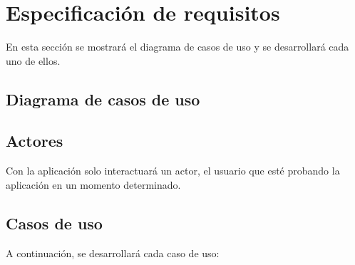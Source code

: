 \section{Especificación de requisitos}
En esta sección se mostrará el diagrama de casos de uso y se desarrollará cada uno de ellos.

\subsection{Diagrama de casos de uso}

\subsection{Actores}
Con la aplicación solo interactuará un actor, el usuario que esté probando la aplicación en un momento determinado.

\subsection{Casos de uso}
A continuación, se desarrollará cada caso de uso: